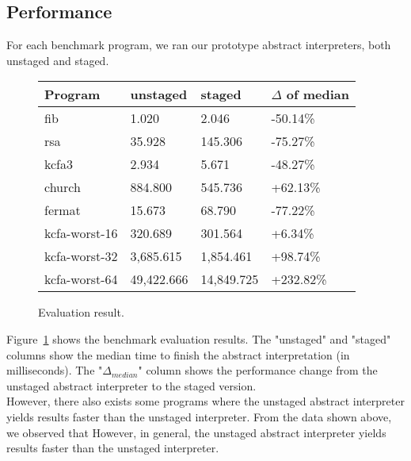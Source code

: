 \subsection{Performance}

For each benchmark program, we ran our prototype abstract interpreters, both unstaged and staged.

\begin{figure}[h]
\begin{tabular}{@{}llll@{}}
\toprule
    Program            & unstaged   & staged     & $\Delta$ of median \\ \midrule
    fib                & 1.020      & 2.046      & -50.14\%          \\
    rsa                & 35.928     & 145.306    & -75.27\%          \\
    kcfa3              & 2.934      & 5.671      & -48.27\%          \\
    church             & 884.800    & 545.736    & +62.13\%          \\
    fermat             & 15.673     & 68.790     & -77.22\%          \\
    kcfa-worst-16      & 320.689    & 301.564    & +6.34\%           \\
    kcfa-worst-32      & 3,685.615  & 1,854.461  & +98.74\%          \\
    kcfa-worst-64      & 49,422.666 & 14,849.725 & +232.82\%         \\
    \bottomrule
\end{tabular}
\caption{Evaluation result.} \label{evaluation_result}
\end{figure}

Figure~\ref{evaluation_result} shows the benchmark evaluation results. The "unstaged" and "staged" columns
show the median time to finish the abstract interpretation (in milliseconds). The "$\Delta_{median}$"
column shows the performance change from the unstaged abstract interpreter to the staged version.\\

However, there also exists some programs where the unstaged abstract interpreter yields 
results faster than the unstaged interpreter.
From the data shown above, we observed that 
However, in general, the unstaged abstract interpreter yields results faster
than the unstaged interpreter.

